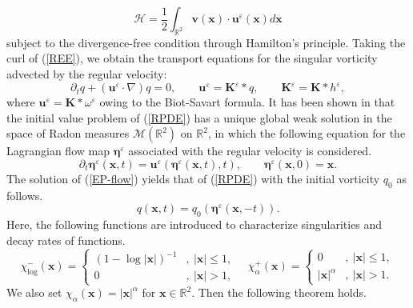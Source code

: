 \documentclass{article}
\theoremstyle{definition}
\begin{document}
\begin{equation*}
\mathscr{H} = \frac{1}{2} \int_{\mathbb{R}^2} {\bm v}({\bm x}) \cdot {\bm u}^\varepsilon({\bm x}) d{\bm x}
\end{equation*}
subject to the divergence-free condition through Hamilton's principle. Taking the curl of (\ref{REE}), we obtain the transport equations 
for the singular vorticity advected by the regular velocity: 
\begin{equation}
\partial_t q + ({\bm u}^\varepsilon \cdot \nabla) q = 0, \qquad {\bm u}^\varepsilon = {\bm K}^\varepsilon \ast q, \qquad {\bm K}^\varepsilon = {\bm K} \ast h^\varepsilon,  \label{RPDE}
\end{equation}
where  ${\bm u}^\varepsilon = {\bm K} \ast \omega^\varepsilon$ owing to the Biot-Savart formula.
It has been shown in \cite{G.3} that the initial value problem of (\ref{RPDE}) has a unique global weak solution in the space of Radon measures $\mathcal{M}(\mathbb{R}^2)$ on
$\mathbb{R}^2$,
in which the following equation for the Lagrangian flow map ${\bm \eta}^\varepsilon$  associated with the regular velocity is considered.
\begin{equation}
\partial_t {\bm \eta}^\varepsilon({\bm x}, t) = {\bm u}^\varepsilon \left( {\bm \eta}^\varepsilon({\bm x}, t), t \right), \qquad  {\bm \eta}^\varepsilon({\bm x}, 0) = {\bm x}. \label{EP-flow}
\end{equation}
The solution of (\ref{EP-flow}) yields that of (\ref{RPDE}) with the initial vorticity $q_0$ as follows.
\begin{equation}
q({\bm x}, t) = q_0 \left( {\bm \eta}^\varepsilon({\bm x}, - t) \right). 
\end{equation}
Here, the following functions  are introduced to characterize singularities and decay rates of functions. 
\begin{equation*}
\chi_{\log}^{-} ({\bm x})  = \left\{
\begin{array}{cc}
\displaystyle{ \left( 1 - \log{\vert{\bm x}\vert} \right)^{-1} }  &, \ \vert{\bm x}\vert \leq 1 , \\
\displaystyle{ 0 }  &, \ \vert{\bm x}\vert > 1,
\end{array}
\right. \quad 
\chi^{+}_{\alpha}({\bm x}) = \left\{
\begin{array}{cc}
0   &,  \ \vert{\bm x}\vert \leq 1, \\
\vert{\bm x}\vert^\alpha  &,  \ \vert{\bm x}\vert > 1 .
\end{array}
\right. 
\end{equation*}
We also set $\chi_{\alpha}({\bm x}) = \vert{\bm x}\vert^\alpha$ for ${\bm x}\in \mathbb{R}^2$. Then the following theorem holds.
\end{document}
